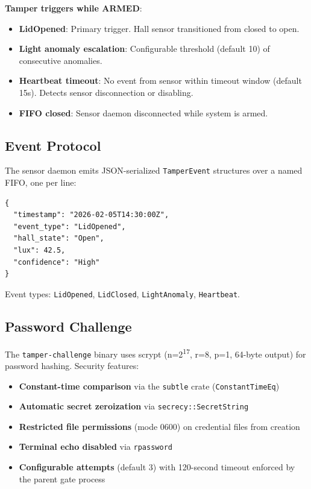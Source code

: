 \documentclass[11pt,letterpaper]{article}
\begin{document}
\textbf{Tamper triggers while ARMED}:
\begin{itemize}
  \item \textbf{LidOpened}: Primary trigger. Hall sensor transitioned from closed to open.
  \item \textbf{Light anomaly escalation}: Configurable threshold (default 10) of consecutive anomalies.
  \item \textbf{Heartbeat timeout}: No event from sensor within timeout window (default 15s). Detects sensor disconnection or disabling.
  \item \textbf{FIFO closed}: Sensor daemon disconnected while system is armed.
\end{itemize}

\subsection{Event Protocol}

The sensor daemon emits JSON-serialized \texttt{TamperEvent} structures over a named FIFO, one per line:

\begin{lstlisting}
{
  "timestamp": "2026-02-05T14:30:00Z",
  "event_type": "LidOpened",
  "hall_state": "Open",
  "lux": 42.5,
  "confidence": "High"
}
\end{lstlisting}

Event types: \texttt{LidOpened}, \texttt{LidClosed}, \texttt{LightAnomaly}, \texttt{Heartbeat}.

\subsection{Password Challenge}

The \texttt{tamper-challenge} binary uses scrypt (n=2\textsuperscript{17}, r=8, p=1, 64-byte output) for password hashing. Security features:

\begin{itemize}
  \item \textbf{Constant-time comparison} via the \texttt{subtle} crate (\texttt{ConstantTimeEq})
  \item \textbf{Automatic secret zeroization} via \texttt{secrecy::SecretString}
  \item \textbf{Restricted file permissions} (mode 0600) on credential files from creation
  \item \textbf{Terminal echo disabled} via \texttt{rpassword}
  \item \textbf{Configurable attempts} (default 3) with 120-second timeout enforced by the parent gate process
\end{itemize}
\end{document}
